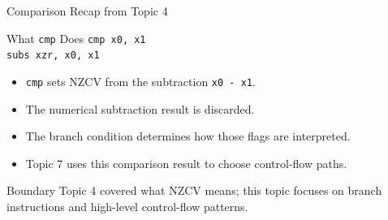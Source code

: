 \documentclass[aspectratio=169,11pt,t]{beamer}
\newcommand{\code}[1]{\texttt{#1}}
\begin{document}

\begin{frame}{Comparison Recap from Topic 4}
\begin{block}{What \code{cmp} Does}
\large
\hspace{3.8cm}\code{cmp x0, x1}\\[0.12cm]
\hspace{3.8cm}\code{subs xzr, x0, x1}
\normalsize
\end{block}
\vspace{0.22cm}
\begin{itemize}
\item \code{cmp} sets NZCV from the subtraction \code{x0 - x1}.
\item The numerical subtraction result is discarded.
\item The branch condition determines how those flags are interpreted.
\item Topic 7 uses this comparison result to choose control-flow paths.
\end{itemize}
\vspace{0.15cm}
\begin{block}{Boundary}
Topic 4 covered what NZCV means; this topic focuses on branch instructions and high-level control-flow patterns.
\end{block}
\end{frame}



\end{document}

